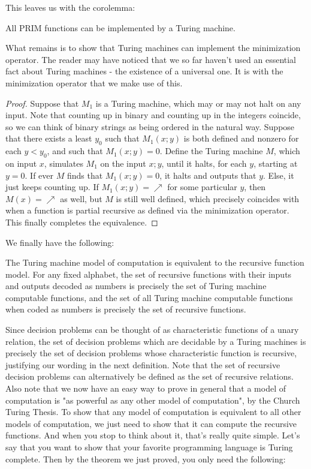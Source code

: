 This leaves us with the corolemma:
\begin{corollary}
    All PRIM functions can be implemented by a Turing machine.
\end{corollary}
What remains is to show that Turing machines can implement the minimization operator. The reader may have noticed that we so far haven't used an essential fact about Turing machines - the existence of a universal one. It is with the minimization operator that we make use of this. \par 
\begin{proof}
Suppose that $M_1$ is a Turing machine, which may or may not halt on any input. Note that counting up in binary and counting up in the integers coincide, so we can think of binary strings as being ordered in the natural way. Suppose that there exists a least $y_0$ such that $M_1(x;y)$ is both defined and nonzero for each $y<y_0$, and such that $M_1(x;y)=0$. Define the Turing machine $M$, which on input $x$, simulates $M_1$ on the input $x;y$, until it halts, for each $y$, starting at $y=0$. If ever $M$ finds that $M_1(x;y)=0$, it halts and outputs that $y$. Else, it just keeps counting up. If $M_1(x;y)=\nearrow$ for some particular $y$, then $M(x)=\nearrow$ as well, but $M$ is still well defined, which precisely coincides with when a function is partial recursive as defined via the minimization operator. This finally completes the equivalence.
\end{proof}
We finally have the following:
\begin{theorem}
    \par The Turing machine model of computation is equivalent to the recursive function model. For any fixed alphabet, the set of recursive functions with their inputs and outputs decoded as numbers is precisely the set of Turing machine computable functions, and the set of all Turing machine computable functions when coded as numbers is precisely the set of recursive functions.
\end{theorem}
Since decision problems can be thought of as characteristic functions of a unary relation, the set of decision problems which are decidable by a Turing machines is precisely the set of decision problems whose characteristic function is recursive, justifying our wording in the next definition.
Note that the set of recursive decision problems can alternatively be defined as the set of recursive relations. Also note that we now have an easy way to prove in general that a model of computation is "as powerful as any other model of computation", by the Church Turing Thesis. To show that any model of computation is equivalent to all other models of computation, we just need to show that it can compute the recursive functions. And when you stop to think about it, that's really quite simple. Let's say that you want to show that your favorite programming language is Turing complete. Then by the theorem we just proved, you only need the following:
